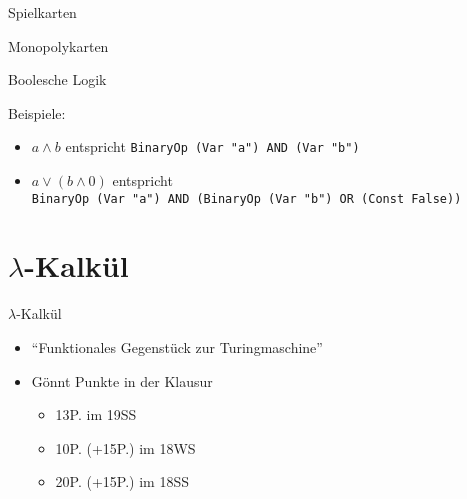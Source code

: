 \documentclass{beamer}
\begin{document}
\begin{frame}{Spielkarten}
\end{frame}

\begin{frame}{Monopolykarten}
\end{frame}

\begin{frame}{Boolesche Logik}

  \vfill

  Beispiele:
  \begin{itemize}
    \item $a \wedge b$ entspricht \texttt{BinaryOp (Var "{}a"{}) AND (Var "{}b"{})}
    \item $a \vee (b \wedge 0)$ entspricht\\
          \texttt{BinaryOp (Var "{}a"{}) AND (BinaryOp (Var "{}b"{}) OR (Const False))}
  \end{itemize}
\end{frame}

\section{$\lambda$-Kalkül}

\begin{frame}{$\lambda$-Kalkül}
	\begin{itemize}
                \item \enquote{Funktionales Gegenstück zur Turingmaschine}
		\item Gönnt Punkte in der Klausur
		\begin{itemize}
			\item 13P. im 19SS
			\item 10P. (+15P.) im 18WS
			\item 20P. (+15P.) im 18SS
		\end{itemize}
	\end{itemize}
\end{frame}
\end{document}
